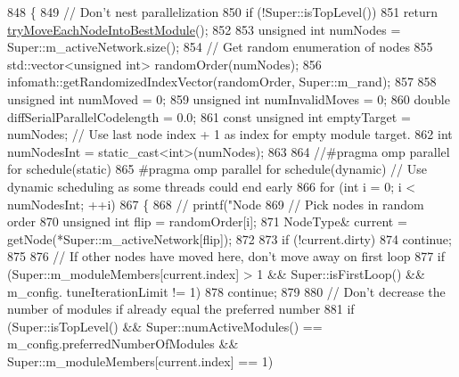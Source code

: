 \begin{DoxyCode}
848 \{
849     \textcolor{comment}{// Don't nest parallelization}
850     \textcolor{keywordflow}{if} (!Super::isTopLevel())
851         \textcolor{keywordflow}{return} \mbox{\hyperlink{classInfomapGreedyCommon_a25af363aae49138b379a823b6ab2ad5c}{tryMoveEachNodeIntoBestModule}}();
852 
853     \textcolor{keywordtype}{unsigned} \textcolor{keywordtype}{int} numNodes = Super::m\_activeNetwork.size();
854     \textcolor{comment}{// Get random enumeration of nodes}
855     std::vector<unsigned int> randomOrder(numNodes);
856     infomath::getRandomizedIndexVector(randomOrder, Super::m\_rand);
857 
858     \textcolor{keywordtype}{unsigned} \textcolor{keywordtype}{int} numMoved = 0;
859     \textcolor{keywordtype}{unsigned} \textcolor{keywordtype}{int} numInvalidMoves = 0;
860     \textcolor{keywordtype}{double} diffSerialParallelCodelength = 0.0;
861     \textcolor{keyword}{const} \textcolor{keywordtype}{unsigned} \textcolor{keywordtype}{int} emptyTarget = numNodes; \textcolor{comment}{// Use last node index + 1 as index for empty module target.}
862     \textcolor{keywordtype}{int} numNodesInt = \textcolor{keyword}{static\_cast<}\textcolor{keywordtype}{int}\textcolor{keyword}{>}(numNodes);
863 
864 \textcolor{comment}{//#pragma omp parallel for schedule(static)}
865 \textcolor{preprocessor}{#pragma omp parallel for schedule(dynamic) // Use dynamic scheduling as some threads could end early}
866     \textcolor{keywordflow}{for} (\textcolor{keywordtype}{int} i = 0; i < numNodesInt; ++i)
867     \{
868 \textcolor{comment}{//      printf("Node %
869         \textcolor{comment}{// Pick nodes in random order}
870         \textcolor{keywordtype}{unsigned} \textcolor{keywordtype}{int} flip = randomOrder[i];
871         NodeType& current = getNode(*Super::m\_activeNetwork[flip]);
872 
873         \textcolor{keywordflow}{if} (!current.dirty)
874             \textcolor{keywordflow}{continue};
875 
876         \textcolor{comment}{// If other nodes have moved here, don't move away on first loop}
877         \textcolor{keywordflow}{if} (Super::m\_moduleMembers[current.index] > 1 && Super::isFirstLoop() && m\_config.
      tuneIterationLimit != 1)
878             \textcolor{keywordflow}{continue};
879 
880         \textcolor{comment}{// Don't decrease the number of modules if already equal the preferred number}
881         \textcolor{keywordflow}{if} (Super::isTopLevel() && Super::numActiveModules() == m\_config.preferredNumberOfModules && 
      Super::m\_moduleMembers[current.index] == 1)
}
\end{DoxyCode}
